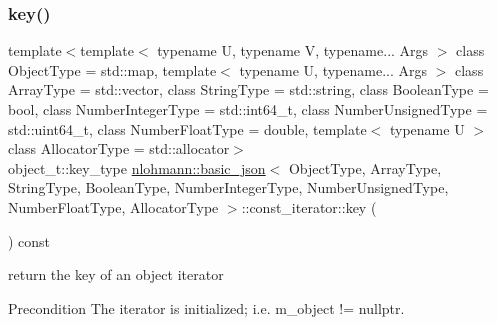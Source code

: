 \subsubsection{\texorpdfstring{key()}{key()}}
{\footnotesize\ttfamily template$<$template$<$ typename U, typename V, typename... Args $>$ class Object\+Type = std\+::map, template$<$ typename U, typename... Args $>$ class Array\+Type = std\+::vector, class String\+Type  = std\+::string, class Boolean\+Type  = bool, class Number\+Integer\+Type  = std\+::int64\+\_\+t, class Number\+Unsigned\+Type  = std\+::uint64\+\_\+t, class Number\+Float\+Type  = double, template$<$ typename U $>$ class Allocator\+Type = std\+::allocator$>$ \\
object\+\_\+t\+::key\+\_\+type \hyperlink{classnlohmann_1_1basic__json}{nlohmann\+::basic\+\_\+json}$<$ Object\+Type, Array\+Type, String\+Type, Boolean\+Type, Number\+Integer\+Type, Number\+Unsigned\+Type, Number\+Float\+Type, Allocator\+Type $>$\+::const\+\_\+iterator\+::key (\begin{DoxyParamCaption}{ }\end{DoxyParamCaption}) const\hspace{0.3cm}{\ttfamily [inline]}}



return the key of an object iterator 

\begin{DoxyPrecond}{Precondition}
The iterator is initialized; i.\+e. {\ttfamily m\+\_\+object != nullptr}. 
\end{DoxyPrecond}
\hypertarget{classnlohmann_1_1basic__json_1_1const__iterator_a2defc155f17e8325747d2f884bb60eab}{}\label{classnlohmann_1_1basic__json_1_1const__iterator_a2defc155f17e8325747d2f884bb60eab} 
